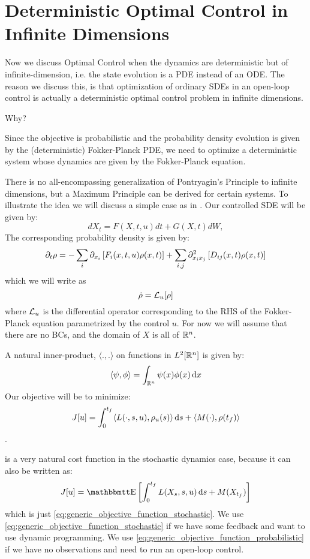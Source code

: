 \section{Deterministic Optimal Control in Infinite Dimensions}
Now we discuss Optimal Control when the dynamics are deterministic but of
infinite-dimension, i.e. the state evolution is a PDE instead of an ODE.  The
reason we discuss this, is that optimization of ordinary SDEs in an open-loop
control is actually a deterministic optimal control problem in infinite
dimensions.

Why?

Since the objective is probabilistic and the probability density evolution is
given by the (deterministic) Fokker-Planck PDE, we need to optimize a
deterministic system whose dynamics are given by the Fokker-Planck equation.

There is no all-encompassing generalization of Pontryagin's Principle to
infinite dimensions, but a Maximum Principle can be derived for certain systems.
To illustrate the idea we will discuss a simple case as in \cite{Palmer2011}.
Our controlled SDE will be given by: 
$$ dX_t = F(X,t, u) dt + G(X,t) dW, $$
The corresponding probability density is given by: $$ {\partial}_t {\rho}=
-\sum_i {\partial}_{x_i} \left[ F_i(x,t,u) {\rho}(x,t) \right] + \sum_{i,j}  {\partial}^2_{x_i
x_j} \left[ D_{ij}(x,t) {\rho}(x,t) \right] $$ which we will write as $$ \dot{{\rho}} =
{ \mathcal{L} }_{u} [{\rho}] $$ where ${ \mathcal{L} }_{u}$ is the differential operator corresponding to the
RHS of the Fokker-Planck equation parametrized by the control $u$. For now we
will assume that there are no BCs, and the domain of $X$ is all of ${ \mathbb{R} }^n$.

A natural inner-product, $ \langle.,. \rangle$ on functions in $L^2[{ \mathbb{R} }^n]$ is
given by: $$
 \langle\psi,\phi  \rangle = \int_{{ \mathbb{R} }^n} \psi(x) \phi(x) \, \mathrm{d} x
$$
Our objective will be to minimize:
\begin{equation}
J[u] = \int_0^{ t_f }  \langle L(\cdot,s,u), {\rho}_u(s) \rangle \, \mathrm{d} s +  
\langle M(\cdot),{\rho}({ t_f }) \rangle
\label{eq:generic_objective_function_probabilistic}  
\end{equation}.

 is a very natural cost
function in the stochastic dynamics case, because it can also be written as: 
$$
J[u] = \Exp \left[ \int_0^\tf  L(X_s, s,u) \intd{s} + M(X_\tf) \right] 
$$ which
is just \cref{eq:generic_objective_function_stochastic}. We use
\cref{eq:generic_objective_function_stochastic} if we have some feedback and
want to use dynamic programming. We use
\cref{eq:generic_objective_function_probabilistic} if we have no observations
and need to run an open-loop control.

